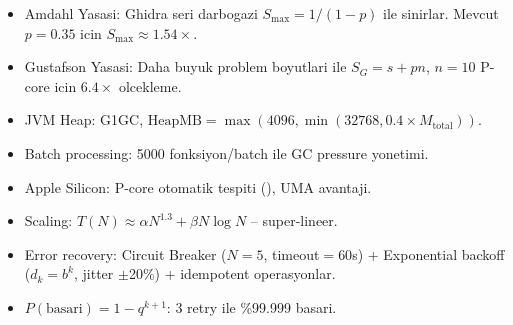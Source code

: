 \begin{ozet}
\begin{itemize}
  \item Amdahl Yasasi: Ghidra seri darbogazi $S_{\max} = 1/(1-p)$ ile sinirlar.
        Mevcut $p = 0.35$ icin $S_{\max} \approx 1.54\times$.
  \item Gustafson Yasasi: Daha buyuk problem boyutlari ile $S_G = s + pn$,
        $n=10$ P-core icin $6.4\times$ olcekleme.
  \item JVM Heap: G1GC, $\text{HeapMB} = \max(4096, \min(32768, 0.4 \times M_{\text{total}}))$.
  \item Batch processing: 5000 fonksiyon/batch ile GC pressure yonetimi.
  \item Apple Silicon: P-core otomatik tespiti (), UMA avantaji.
  \item Scaling: $T(N) \approx \alpha N^{1.3} + \beta N \log N$ -- super-lineer.
  \item Error recovery: Circuit Breaker ($N=5$, timeout$=60$s) + Exponential
        backoff ($d_k = b^k$, jitter $\pm$20\%) + idempotent operasyonlar.
  \item $P(\text{basari}) = 1 - q^{k+1}$: 3 retry ile \%99.999 basari.
\end{itemize}
\end{ozet}
